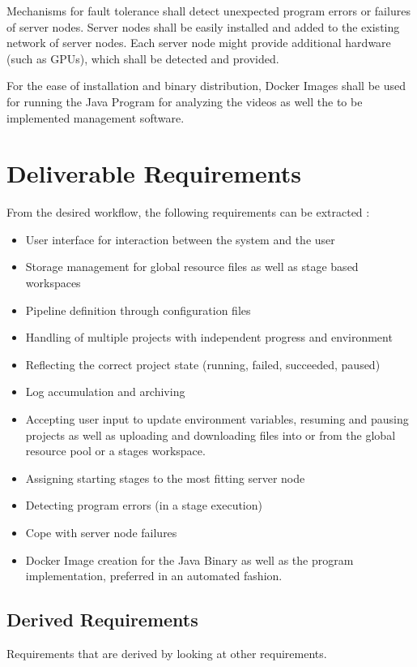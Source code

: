 Mechanisms for fault tolerance shall detect unexpected program errors or failures of server nodes.
Server nodes shall be easily installed and added to the existing network of server nodes.
Each server node might provide additional hardware (such as GPUs), which shall be detected and provided.

For the ease of installation and binary distribution, Docker Images shall be used for running the Java Program for analyzing the videos as well the to be implemented management software.





\section{Deliverable Requirements}

From the desired workflow, the following requirements can be extracted :

\begin{itemize}
	\item User interface for interaction between the system and the user
	\item Storage management for global resource files as well as stage based workspaces
	\item Pipeline definition through configuration files
	\item Handling of multiple projects with independent progress and environment
	\item Reflecting the correct project state (running, failed, succeeded, paused)
	\item Log accumulation and archiving
	\item Accepting user input to update environment variables, resuming and pausing projects as well as uploading and downloading files into or from the global resource pool or a stages workspace.
	\item Assigning starting stages to the most fitting server node
	\item Detecting program errors (in a stage execution)
	\item Cope with server node failures
	\item {} Docker Image creation for the Java Binary as well as the program implementation, preferred in an automated fashion.
\end{itemize}

\subsection{Derived Requirements} 
Requirements that are derived by looking at other requirements.


